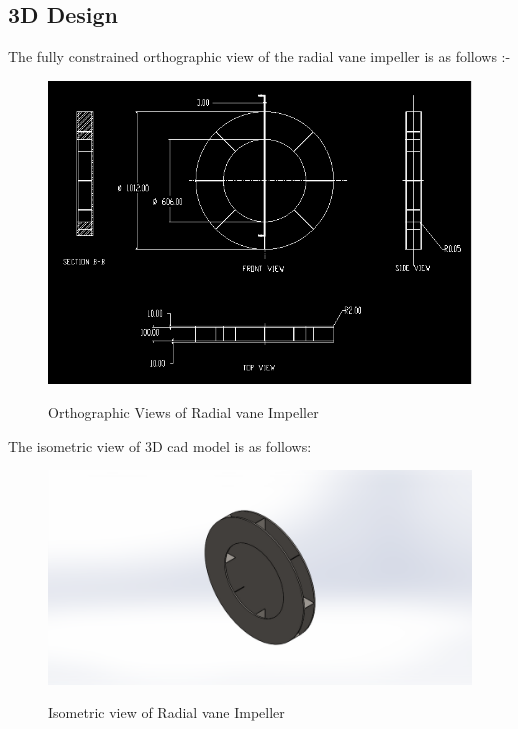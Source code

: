 \documentclass[11pt]{article}
\begin{document}
\subsection{3D Design}
 The fully constrained orthographic view of the radial vane impeller is as follows :-\\
\begin{figure}[H]
\centering
\includegraphics[scale=.6]{orthographic.png}\\
\caption{Orthographic Views of Radial vane Impeller}
\end{figure}
\clearpage
The isometric view of 3D cad model is as follows:\\
 \begin{center}
 \begin{figure}[hbt!]
 \centering
 \includegraphics[scale=.5]{isometric.png}\\
 \caption{Isometric view of Radial vane Impeller}
 \end{figure}
 \end{center}
\end{document}
